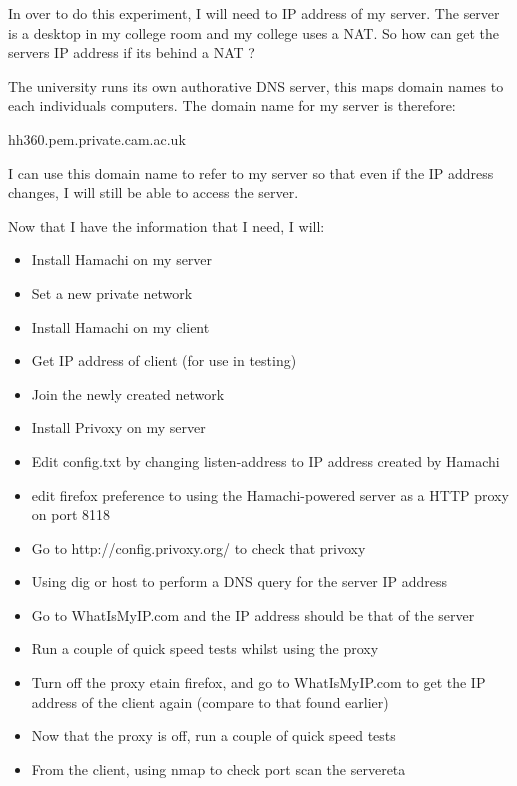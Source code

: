 \documentclass[12pt,a4paper,oneside]{article}
\begin{document}
{In over to do this experiment, I will need to IP address of my server. The server is a desktop in my college room and my college uses a NAT. So how can get the servers IP address if its behind a NAT ?

The university runs its own authorative DNS server, this maps domain names to each individuals computers. The domain name for my server is therefore:

hh360.pem.private.cam.ac.uk

I can use this domain name to refer to my server so that even if the IP address changes, I will still be able to access the server.


Now that I have the information that I need, I will:
\begin{itemize}
\item Install Hamachi on my server
\item Set a new private network
\item Install Hamachi on my client
\item Get IP address of client (for use in testing)
\item Join the newly created network
\item Install Privoxy on my server
\item Edit config.txt by changing listen-address to IP address created by Hamachi
\item edit firefox preference to using the Hamachi-powered server as a HTTP proxy on port 8118
\item Go to http://config.privoxy.org/ to check that privoxy
\item Using dig or host to perform a DNS query for the server IP address
\item Go to WhatIsMyIP.com and the IP address should be that of the server
\item Run a couple of quick speed tests whilst using the proxy
\item Turn off the proxy etain firefox, and go to WhatIsMyIP.com to get the IP address of the client again (compare to that found earlier)
\item Now that the proxy is off, run a couple of quick speed tests 
\item From the client, using nmap to check port scan the servereta
\end{itemize}

}
\end{document}
